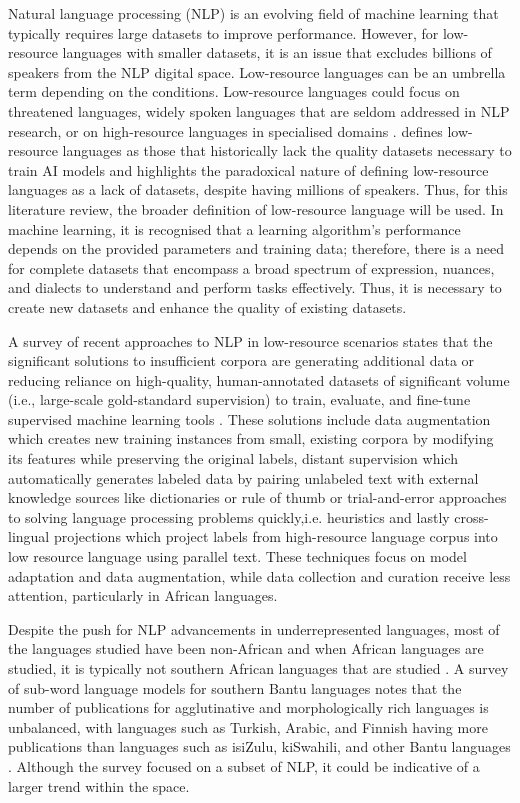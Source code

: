 \documentclass[11pt,a4paper]{article}
\begin{document}
Natural language processing (NLP) is an evolving field of machine learning that typically requires large datasets to improve performance. However, for low-resource languages with smaller datasets, it is an issue that excludes billions of speakers from the NLP digital space. Low-resource languages can be an umbrella term depending on the conditions. Low-resource languages could focus on threatened languages, widely spoken languages that are seldom addressed in NLP research, or on high-resource languages in specialised domains \citep{Hedderich2021}. \citet{Shahid2025} defines low-resource languages as those that historically lack the quality datasets necessary to train AI models and highlights the paradoxical nature of defining low-resource languages as a lack of datasets, despite having millions of speakers. Thus, for this literature review, the broader definition of low-resource language will be used. In machine learning, it is recognised that a learning algorithm's performance depends on the provided parameters and training data; therefore, there is a need for complete datasets that encompass a broad spectrum of expression, nuances, and dialects to understand and perform tasks effectively. Thus, it is necessary to create new datasets and enhance the quality of existing datasets. 

A survey of recent approaches to NLP in low-resource scenarios states that the significant solutions to insufficient corpora are generating additional data or reducing reliance on high-quality, human-annotated datasets of significant volume (i.e., large-scale gold-standard supervision) to train, evaluate, and fine-tune supervised machine learning tools \citep{Hedderich2021}. These solutions include data augmentation which creates new training instances from small, existing corpora by modifying its features while preserving the original labels, distant supervision which automatically generates labeled data by pairing unlabeled text with external knowledge sources like dictionaries or rule of thumb or trial-and-error approaches to solving language processing problems quickly,i.e. heuristics and lastly cross-lingual projections which project labels from high-resource language corpus into low resource language using parallel text. These techniques focus on model adaptation and data augmentation, while data collection and curation receive less attention, particularly in African languages.

\vspace{1em}
Despite the push for NLP advancements in underrepresented languages, most of the languages studied have been non-African and when African languages are studied, it is typically not southern African languages that are studied \citep{joshi-etal-2020-state}. A survey of sub-word language models for southern Bantu languages notes that the number of publications for agglutinative and morphologically rich languages is unbalanced, with languages such as Turkish, Arabic, and Finnish having more publications than languages such as isiZulu, kiSwahili, and other Bantu languages \citep{Kambarami2021}. Although the survey focused on a subset of NLP, it could be indicative of a larger trend within the space. 
\end{document}
